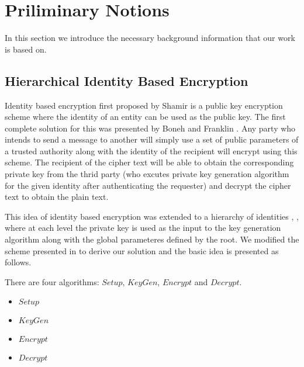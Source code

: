 \section{Priliminary Notions}

In this section we introduce the necessary background information that our work is based on.

\subsection{Hierarchical Identity Based Encryption}
Identity based encryption first proposed by Shamir\cite{Shamir:1985:ICS:19478.19483} is a public key encryption scheme where the identity of an entity can be used as the public key. The first complete solution for this was presented by Boneh and Franklin \cite{Boneh:2003:IEW:639069.639089}. Any party who intends to send a message to another will simply use a set of public parameters of a trusted authority along with the identity of the recipient will encrypt using this scheme. The recipient of the cipher text will be able to obtain the corresponding private key from the thrid party (who excutes private key generation algorithm for the given identity after authenticating the requester) and decrypt the cipher text to obtain the plain text.

This idea of identity based encryption was extended to a hierarchy of identities \cite{Horwitz02towardhierarchical}, \cite{BBG05}, where at each level the private key is used as the input to the key generation algorithm along with the global parameteres defined by the root. We modified the scheme presented in \cite{BBG05} to derive our solution and the basic idea is presented as follows.

There are four algorithms: $Setup$, $KeyGen$, $Encrypt$ and $Decrypt$.
\begin{itemize}
\item $Setup$
\item $KeyGen$
\item $Encrypt$
\item $Decrypt$
\end{itemize}
